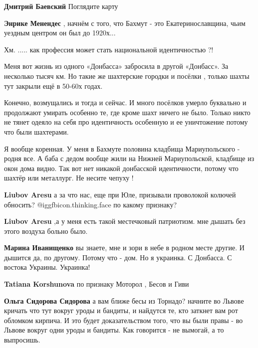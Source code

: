 \begin{itemize}
\begin{itemize} %
\textbf{Дмитрий Баевский} Поглядите карту

\textbf{Энрике Менендес} , начнём с того, что Бахмут - это Екатеринославщина, чьим уездным центром он был до 1920х...
\end{itemize} %


Хм. ..... как профессия может стать национальной идентичностью ?!

Меня вот жизнь из одного «Донбасса» забросила в другой «Донбасс». За несколько
тысяч км. Но такие же шахтерские городки и посёлки , только шахты тут закрыли
ещё в 50-60х годах.

Конечно, возмущались и тогда и сейчас. И много посёлков умерло буквально и
продолжают умирать особенно те, где кроме шахт ничего не было. Только никто не
тянет одеяло на себя про идентичность особенную и ее уничтожение потому что
были шахтерами.

Я вообще коренная. У меня в Бахмуте половина кладбища Мариупольского - родня
все. А баба с дедом вообще жили на Нижней Мариупольской, кладбище из окон дома
видно. Так вот нет никакой донбасской идентичности, потому что шахтёр или
металлург. Не несите чепуху !

\begin{itemize} %
\textbf{Liubov Aresu} а за что нас, еще при Юле, призывали проволокой колючей обносить? @igg{fbicon.thinking.face} по какому признаку?

\textbf{Liubov Aresu} ,а у меня есть такой местечковый патриотизм. мне дышать без этого воздуха больно было.

\textbf{Марина Иванищенко} вы знаете, мне и зори в небе в родном месте другие. И дышится да, по другому. Потому что - дом. Но я украинка. С Донбасса. С востока Украины. Украинка!

\textbf{Tatiana Korshunova} по признаку Моторол , Бесов и Гиви

\textbf{Ольга Сидорова Сидорова} а вам ближе бесы из Торнадо? начните во Львове кричать что тут вокруг уроды и бандиты, и найдутся те, кто заткнет вам рот обломком кирпича. И это будет доказательством того, что вы были правы - во Львове вокруг одни уроды и бандиты.
Как говорится - не вымогай, а то выпросишь.
\end{itemize} %


\end{itemize}
